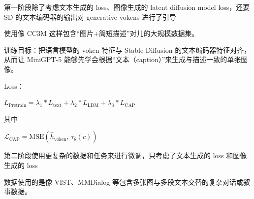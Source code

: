\documentclass[zihao=false,fontset=windows]{ctexart}
\newcommand{\bigmath}[1]{%
  \begin{center}\large$\displaystyle #1$\end{center}%
}
\begin{document}
\par\vspace{0.95em}\par\vspace{0.28em}


第一阶段除了考虑文本生成的 loss、图像生成的 latent diffusion model loss，还要 SD 的文本编码器的输出对 generative vokens 进行了引导\par


使用像 CC3M 这样包含“图片+简短描述”对儿的大规模数据集。\par


训练目标：把语言模型的 voken 特征与 Stable Diffusion 的文本编码器特征对齐，从而让 MiniGPT-5 能够先学会根据“文本（caption）”来生成与描述一致的单张图像。\par


Loss：\par\bigmath{L_{\text{Pretrain}}=\lambda_1 * L_{\text{text}}+\lambda_2 * L_{\mathrm{LDM}}+\lambda_3 * L_{\mathrm{CAP}}}


其中\par\bigmath{\mathcal{L}_{\text{CAP}}=\text{MSE}(\hat{h}_{\text{voken}},\,\tau_{\theta}(c))}


\par\vspace{0.95em}\par\vspace{0.28em}


第二阶段使用更复杂的数据和任务来进行微调，只考虑了文本生成的 loss 和图像生成的 loss\par


数据使用的是像 VIST、MMDialog 等包含多张图与多段文本交替的复杂对话或叙事数据。\par
\end{document}

